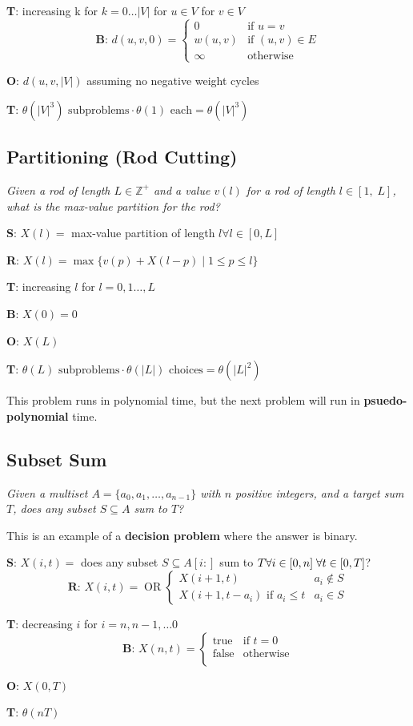 \textbf{T}: increasing k for $k = 0 \dots |V|$ for $u \in V$ for $v \in V$\\[-0.2em]
\[ \textbf{B}\text{: } d(u, v, 0) = \begin{cases} 
    0 & \text{if } u = v \\
    w(u, v) & \text{if } (u, v) \in E \\
    \infty & \text{otherwise}
 \end{cases}
\]

\textbf{O}: $d(u, v, |V|)$ assuming no negative weight cycles

\textbf{T}: $\theta(|V|^3) \text{ subproblems} \cdot \theta(1) \text{ each} = \theta(|V|^3)$

\subsection{Partitioning (Rod Cutting)}
\emph{Given a rod of length $L \in \mathbb{Z}^+$ and a value $v(l)$ for a rod of length $l \in [1, \; L]$, what is the max-value partition for the rod?}

\textbf{S}: $X(l) = $ max-value partition of length $l \forall l \in [0, L]$

\textbf{R}: $X(l) = \max \{ v(p) + X(l - p) \; | \; 1 \leq p \leq l\}$

\textbf{T}: increasing $l$ for $l = 0, 1 \dots, L$

\textbf{B}: $X(0) = 0$

\textbf{O}: $X(L)$

\textbf{T}: $\theta(L) \text{ subproblems} \cdot \theta(|L|) \text{ choices} = \theta(|L|^2)$

This problem runs in polynomial time, but the next problem will run in \textbf{psuedo-polynomial} time.

\subsection{Subset Sum}
\emph{Given a multiset $A = \{ a_0, a_1, \dots, a_{n-1} \}$ with $n$ positive integers, and a target sum $T$, does any subset $S \subseteq A$ sum to $T$?}

This is an example of a \textbf{decision problem} where the answer is binary.

\textbf{S}: $X(i, t) = $ does any subset $S \subseteq A[i:]$ sum to $T \linebreak \forall i \in [0, n] \; \forall t \in [0, T]$?\\[-0.2em]
\[ \textbf{R}\text{: } X(i, t) = \operatorname{OR} \begin{cases} 
    X(i + 1, t) & a_i \notin S \\
    X(i + 1, t - a_i) \text{ if } a_i \leq t & a_i \in S
 \end{cases}
\]

\textbf{T}: decreasing $i$ for $i = n, n - 1, \dots 0$\\[-0.2em]
\[ \textbf{B}\text{: } X(n, t) = \begin{cases} 
    \text{true} & \text{if } t = 0 \\
    \text{false} & \text{otherwise} \\
 \end{cases}
\]

\textbf{O}: $X(0, T)$

\textbf{T}: $\theta(nT)$